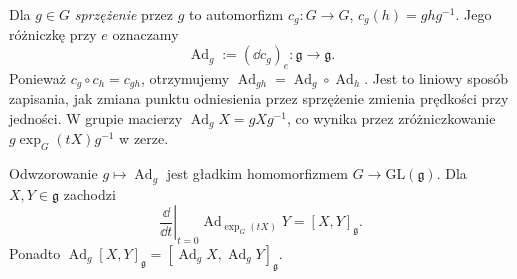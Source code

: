 \begin{definicja}
\label{def:lie-ad}
Dla $g\in G$ \emph{sprzężenie} przez $g$ to automorfizm
$c_g:G\to G$, $c_g(h)=ghg^{-1}$. Jego różniczkę przy $e$
oznaczamy
\[
 \operatorname{Ad}_g:=(\dd c_g)_e:
 \mathfrak g\longrightarrow\mathfrak g.
\]
Ponieważ $c_g\circ c_h=c_{gh}$, otrzymujemy
$\operatorname{Ad}_{gh}=\operatorname{Ad}_g\circ\operatorname{Ad}_h$.
Jest to liniowy sposób zapisania, jak zmiana punktu odniesienia
przez sprzężenie zmienia prędkości przy jedności.
W grupie macierzy $\operatorname{Ad}_gX=gXg^{-1}$,
co wynika przez zróżniczkowanie
$g\exp_G(tX)g^{-1}$ w zerze.
\end{definicja}

\begin{twierdzenie}
\label{thm:lie-ad-bracket}
Odwzorowanie $g\mapsto\operatorname{Ad}_g$ jest gładkim
homomorfizmem $G\to\mathrm{GL}(\mathfrak g)$.
Dla $X,Y\in\mathfrak g$ zachodzi
\begin{equation}\label{eq:lie-ad-bracket}
 \left.\frac{\dd}{\dd t}\right|_{t=0}
 \operatorname{Ad}_{\exp_G(tX)}Y=[X,Y]_{\mathfrak g}.
\end{equation}
Ponadto $\operatorname{Ad}_g[X,Y]_{\mathfrak g}
=[\operatorname{Ad}_gX,\operatorname{Ad}_gY]_{\mathfrak g}$.
\end{twierdzenie}
